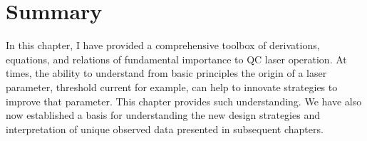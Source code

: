 \documentclass[12pt]{report}
\begin{document}
\section{Summary}

In this chapter, I have provided a comprehensive toolbox of derivations, equations, and relations of fundamental importance to QC laser operation.  At times, the ability to understand from basic principles the origin of a laser parameter, threshold current for example, can help to innovate strategies to improve that parameter.  This chapter provides such understanding.  We have also now established a basis for understanding the new design strategies and interpretation of unique observed data presented in subsequent chapters.





\end{document}
